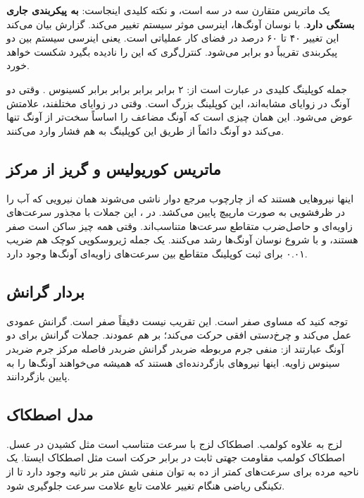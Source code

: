 \documentclass[12pt, a4paper]{article}
\newcommand{\dash}{\lr{---}}
\begin{document}
يک ماتريس متقارن سه در سه است، و نکته کليدی اينجاست: \textbf{به پيکربندی جاری بستگی دارد}. با نوسان آونگ‌ها، اينرسی موثر سيستم تغيير می‌کند. گزارش بيان می‌کند اين تغيير ۴۰ تا ۶۰ درصد در فضای کار عملياتی است. يعنی اينرسی سيستم بين دو پيکربندی تقريباً دو برابر می‌شود. کنترل‌گری که اين را ناديده بگيرد شکست خواهد خورد.

جمله کوپلينگ کليدی در  عبارت است از: ۲ برابر  برابر  برابر  برابر کسينوس . وقتی دو آونگ در زوايای مشابه‌اند، اين کوپلينگ بزرگ است. وقتی در زوايای مختلفند، علامتش عوض می‌شود. اين همان چيزی است که آونگ مضاعف را اساساً سخت‌تر از آونگ تنها می‌کند \dash{} دو آونگ دائماً از طريق اين کوپلينگ به هم فشار وارد می‌کنند.

\subsection{ماتريس کوريولیس و گريز از مرکز}

اينها نيروهایی هستند که از چارچوب مرجع دوار ناشی می‌شوند \dash{} همان نيرويی که آب را در ظرفشويی به صورت مارپيچ پايين می‌کشد. در ، اين جملات با مجذور سرعت‌های زاويه‌ای و حاصل‌ضرب متقاطع سرعت‌ها متناسب‌اند. وقتی همه چيز ساکن است صفر هستند، و با شروع نوسان آونگ‌ها رشد می‌کنند. يک جمله ژيروسکوپی کوچک هم \dash{} ضريب ۰.۰۱ \dash{} برای ثبت کوپلينگ متقاطع بين سرعت‌های زاويه‌ای آونگ‌ها وجود دارد.

\subsection{بردار گرانش}

توجه کنيد که  مساوی صفر است. اين تقريب نيست \dash{} دقيقاً صفر است. گرانش عمودی عمل می‌کند و چرخ‌دستی افقی حرکت می‌کند؛ بر هم عمودند. جملات گرانش برای دو آونگ عبارتند از: منفی جرم مربوطه ضربدر گرانش ضربدر فاصله مرکز جرم ضربدر سينوس زاويه. اينها نيروهای بازگردنده‌ای هستند که هميشه می‌خواهند آونگ‌ها را به پايين بازگردانند.

\subsection{مدل اصطکاک}

لزج به علاوه کولمب. اصطکاک لزج با سرعت متناسب است \dash{} مثل کشيدن در عسل. اصطکاک کولمب مقاومت جهتی ثابت در برابر حرکت است \dash{} مثل اصطکاک ايستا. يک ناحيه مرده برای سرعت‌های کمتر از ده به توان منفی شش متر بر ثانيه وجود دارد تا از تکينگی رياضی هنگام تغيير علامت تابع علامت سرعت جلوگيری شود.
\end{document}
